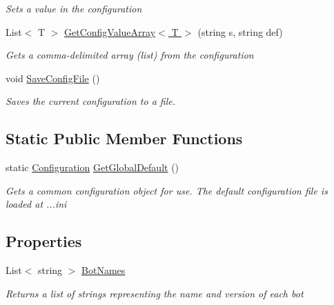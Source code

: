 \begin{DoxyCompactItemize}
\begin{DoxyCompactList}\small\item\em Sets a value in the configuration\end{DoxyCompactList}\item 
List$<$ T $>$ \hyperlink{class_m_b_c_1_1_core_1_1_configuration_a48e56bdacaf0660a45febbe6a402bd83}{Get\-Config\-Value\-Array$<$ T $>$} (string s, string def)
\begin{DoxyCompactList}\small\item\em Gets a comma-\/delimited array (list) from the configuration\end{DoxyCompactList}\item 
void \hyperlink{class_m_b_c_1_1_core_1_1_configuration_a04f21c72d510c6486acfc8c27fdc34ce}{Save\-Config\-File} ()
\begin{DoxyCompactList}\small\item\em Saves the current configuration to a file.\end{DoxyCompactList}\end{DoxyCompactItemize}
\subsection*{Static Public Member Functions}
\begin{DoxyCompactItemize}
\item 
\hypertarget{class_m_b_c_1_1_core_1_1_configuration_a46c9b791926a885880df21e74c5a7196}{static \hyperlink{class_m_b_c_1_1_core_1_1_configuration}{Configuration} \hyperlink{class_m_b_c_1_1_core_1_1_configuration_a46c9b791926a885880df21e74c5a7196}{Get\-Global\-Default} ()}\label{class_m_b_c_1_1_core_1_1_configuration_a46c9b791926a885880df21e74c5a7196}

\begin{DoxyCompactList}\small\item\em Gets a common configuration object for use. The default configuration file is loaded at ...ini\end{DoxyCompactList}\end{DoxyCompactItemize}
\subsection*{Properties}
\begin{DoxyCompactItemize}
\item 
\hypertarget{class_m_b_c_1_1_core_1_1_configuration_ad5261894e43fb858f47873df2d6c847b}{List$<$ string $>$ \hyperlink{class_m_b_c_1_1_core_1_1_configuration_ad5261894e43fb858f47873df2d6c847b}{Bot\-Names}}\label{class_m_b_c_1_1_core_1_1_configuration_ad5261894e43fb858f47873df2d6c847b}

\begin{DoxyCompactList}\small\item\em Returns a list of strings representing the name and version of each bot\end{DoxyCompactList}\end{DoxyCompactItemize}


